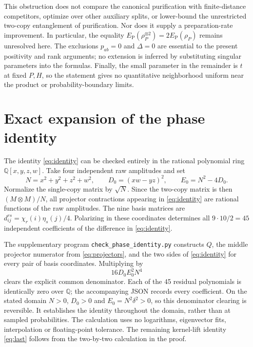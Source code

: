 \documentclass[11pt]{article}
\newcommand{\EP}{E_{\mathrm P}}
\begin{document}
This obstruction does not compare the canonical purification with finite-distance competitors, optimize over other auxiliary splits, or lower-bound the unrestricted two-copy entanglement of purification. Nor does it supply a preparation-rate improvement. In particular, the equality $\EP(\rho_P^{\otimes2})=2\EP(\rho_P)$ remains unresolved here. The exclusions $p_{ab}=0$ and $\Delta=0$ are essential to the present positivity and rank arguments; no extension is inferred by substituting singular parameters into the formulas. Finally, the small parameter in the remainder is $t$ at fixed $P,H$, so the statement gives no quantitative neighborhood uniform near the product or probability-boundary limits.

\appendix
\section{Exact expansion of the phase identity}\label{app:identity}
The identity \eqref{eq:identity} can be checked entirely in the rational polynomial ring $\mathbb Q[x,y,z,w]$. Take four independent raw amplitudes and set
\[
 N=x^2+y^2+z^2+w^2,\qquad D_0=(xw-yz)^2,
 \qquad E_0=N^2-4D_0.
\]
Normalize the single-copy matrix by $\sqrt N$. Since the two-copy matrix is then $(M\otimes M)/N$, all projector contractions appearing in \eqref{eq:identity} are rational functions of the raw amplitudes. The nine basis matrices are $d^{rs}_{ij}=\chi_r(i)\eta_s(j)/4$. Polarizing in these coordinates determines all $9\cdot10/2=45$ independent coefficients of the difference in \eqref{eq:identity}.

The supplementary program \texttt{check\_phase\_identity.py} constructs $Q$, the middle projector numerator from \eqref{eq:projectors}, and the two sides of \eqref{eq:identity} for every pair of basis coordinates. Multiplying by
\begin{equation}\label{eq:denominator}
 16D_0E_0^2N^4
\end{equation}
clears the explicit common denominator. Each of the 45 residual polynomials is identically zero over $\mathbb Q$; the accompanying JSON records every coefficient. On the stated domain $N>0$, $D_0>0$ and $E_0=N^2\delta^2>0$, so this denominator clearing is reversible. It establishes the identity throughout the domain, rather than at sampled probabilities. The calculation uses no logarithms, eigenvector fits, interpolation or floating-point tolerance. The remaining kernel-lift identity \eqref{eq:last} follows from the two-by-two calculation in the proof.
\end{document}
